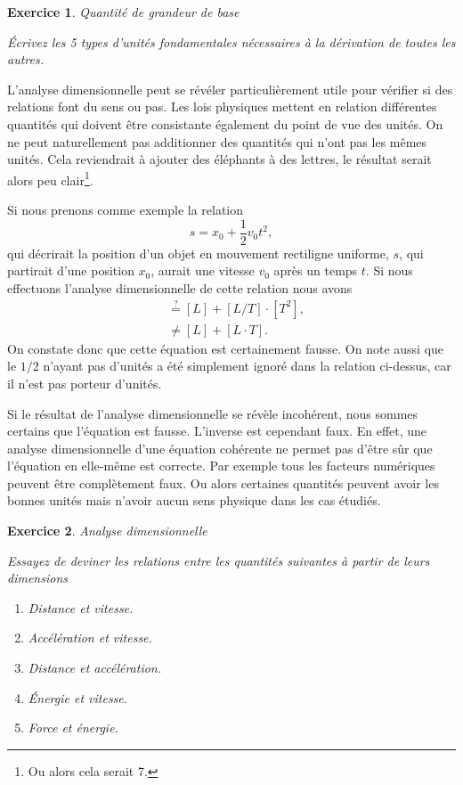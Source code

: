 \documentclass[a4paper,12pt]{book}
\newtheorem{exercice}{Exercice}
\begin{document}
\begin{exercice}{Quantité de grandeur de base}

Écrivez les 5 types d'unités fondamentales nécessaires à la dérivation de toutes les autres.
\end{exercice}

L'analyse dimensionnelle peut se révéler particulièrement utile pour vérifier si des relations font du sens ou pas. Les lois physiques
mettent en relation différentes quantités qui doivent être consistante également du point de vue des unités.
On ne peut naturellement pas additionner des quantités qui n'ont pas les mêmes unités. 
Cela reviendrait à ajouter des éléphants à des lettres, le résultat serait alors peu clair\footnote{Ou alors cela serait 7.}.

Si nous prenons comme exemple la relation
\begin{equation}
 s=x_0+\frac{1}{2}v_0 t^2,
\end{equation}
qui décrirait la position d'un objet en mouvement rectiligne uniforme, $s$, qui partirait d'une position $x_0$,
aurait une vitesse $v_0$ après un temps $t$. Si nous effectuons l'analyse dimensionnelle de cette relation nous avons
\begin{align}
 [L]&\stackrel{?}{=}[L]+[L/T]\cdot [T^2],\nonumber\\
 &\neq[L]+[L\cdot T].
\end{align}
On constate donc que cette équation est certainement fausse. On note aussi que le $1/2$ n'ayant pas d'unités a été simplement ignoré dans la relation ci-dessus,
car il n'est pas porteur d'unités.

Si le résultat de l'analyse dimensionnelle se révèle incohérent, nous sommes certains que l'équation est fausse. 
L'inverse est cependant faux. En effet, une analyse dimensionnelle d'une équation cohérente ne permet pas d'être sûr que l'équation en elle-même est correcte. 
Par exemple tous les facteurs numériques peuvent être complètement faux. Ou alors certaines quantités peuvent avoir les bonnes unités mais n'avoir aucun sens physique dans
les cas étudiés.



\begin{exercice}{Analyse dimensionnelle}

Essayez de deviner les relations entre les quantités suivantes à partir de leurs dimensions
\begin{enumerate}
\item Distance et vitesse.
\item Accélération et vitesse.
\item Distance et accélération.
\item Énergie et vitesse.
\item Force et énergie.
\end{enumerate}

\end{exercice}
\end{document}
